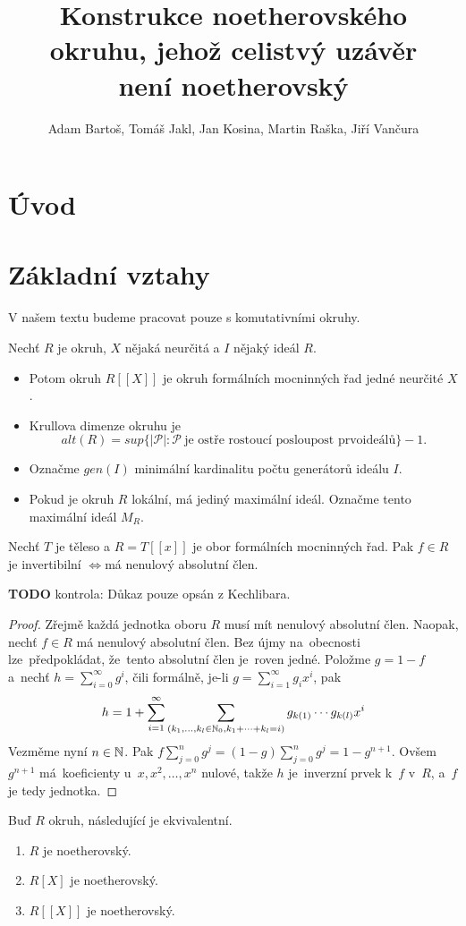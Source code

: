 \documentclass[11pt,a4paper]{article}
\title{Konstrukce noetherovského okruhu, jehož celistvý uzávěr\\ není
	noetherovský}
\author{Adam Bartoš, Tomáš Jakl, Jan Kosina, Martin Raška, Jiří Vančura}
\newcommand\p[1]{\mathcal{ #1 }} %
\newcommand\IFF{\ensuremath{\iff}}
\theoremstyle{definition}
\theoremstyle{plain}
\begin{document}
\maketitle
\section{Úvod}

\section{Základní vztahy}
V našem textu budeme pracovat pouze s komutativními okruhy.

 Nechť $R$ je okruh, $X$ nějaká neurčitá a $I$ nějaký ideál $R$.
\begin{itemize}
	\item Potom okruh $R[[X]]$ je okruh formálních mocninných řad jedné
	neurčité $X$.
	\item Krullova dimenze okruhu je $$alt(R) = sup \{ |\p P| : \p P~\text{je
	ostře rostoucí posloupost prvoideálů} \} - 1.$$
	\item Označme $gen(I)$ minimální kardinalitu počtu generátorů ideálu $I$.
	\item Pokud je okruh $R$ lokální, má jediný maximální ideál. Označme tento
	maximální ideál $M_R$.
\end{itemize}

\veta Nechť $T$ je těleso a $R = T[[x]]$ je obor formálních mocninných řad. Pak
$f \in R$ je invertibilní \IFF má nenulový absolutní člen.

\textbf{TODO} kontrola: Důkaz pouze opsán z Kechlibara.

\begin{proof}
	Zřejmě každá jednotka oboru $R$ musí mít nenulový absolutní člen. Naopak,
	nechť $f\in R$ má nenulový absolutní člen. Bez újmy na~obecnosti
	lze~před\-po\-klá\-dat, že~tento absolutní člen je~roven jedné. Položme $g=
	1-f$ a~nechť $h =  \sum_{i= 0}^\infty g^i$, čili formálně, je-li $g=
	\sum_{i= 1}^\infty g_ix^i$, pak $$h= 1+\sum_{i= 1}^\infty
	\sum_{(k_1,\dots,k_l\in \Bbb N_0, k_1+\dots+k_l= i)} g_{k(1)}\cdots
	g_{k(l)}x^i$$ Vezměme nyní $n\in \Bbb N$. Pak $f\sum_{j= 0}^n g^j =
	(1-g)\sum_{j= 0}^n g^j =  1 - g^{n+1}$. Ovšem $g^{n+1}$ má~koeficienty
	u~$x,x^2,\dots,x^n$ nulové, takže $h$ je~inverzní prvek k~$f$ v~$R$, a~$f$
	je tedy jednotka.
\end{proof}

 Buď $R$ okruh, následující je ekvivalentní.
\begin{enumerate}
	\item $R$ je noetherovský.
	\item $R[X]$ je noetherovský.
	\item $R[[X]]$ je noetherovský.
\end{enumerate}
\end{document}
